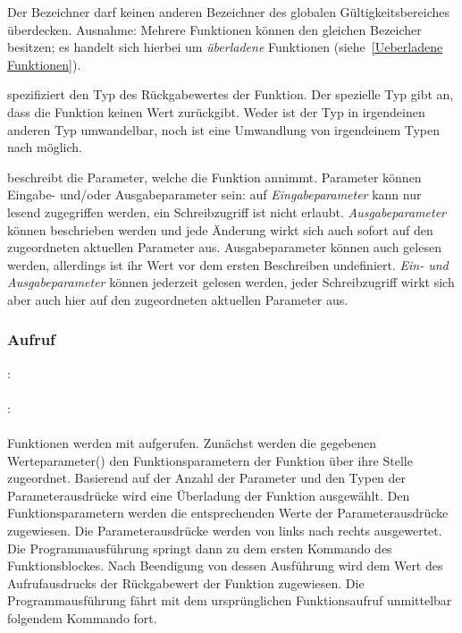 Der Bezeichner darf keinen anderen Bezeichner des globalen Gültigkeitsbereiches überdecken.
Ausnahme: Mehrere Funktionen können den gleichen Bezeicher besitzen; es handelt sich hierbei
um \emph{überladene} Funktionen (siehe~\ref{Ueberladene Funktionen}).

 spezifiziert den Typ des Rückgabewertes der Funktion. Der spezielle Typ 
gibt an, dass die Funktion keinen Wert zurückgibt.
Weder ist der Typ  in irgendeinen anderen Typ umwandelbar, noch ist eine Umwandlung
von irgendeinem Typen nach  möglich.

 beschreibt die Parameter, welche die Funktion annimmt.
Parameter können Eingabe- und/oder Ausgabeparameter sein: auf \emph{Eingabeparameter} kann
nur lesend zugegriffen werden, ein Schreibzugriff ist nicht erlaubt.
\emph{Ausgabeparameter} können beschrieben werden und jede Änderung wirkt sich auch sofort auf
den zugeordneten aktuellen Parameter aus. Ausgabeparameter können auch gelesen werden,
allerdings ist ihr Wert vor dem ersten Beschreiben undefiniert.
\emph{Ein- und Ausgabeparameter} können jederzeit gelesen werden, jeder Schreibzugriff wirkt sich
aber auch hier auf den zugeordneten aktuellen Parameter aus.



\subsubsection{Aufruf}\label{Aufruf}
:\label{funktion_aufruf}\\
\hspace*{1cm} \Gspace\Gt{(}\Gspace{}\Gspace\Gt{)}\\
:\label{funktion_param_aktuell}\\
\hspace*{1cm} \Gspace{}\\

Funktionen werden mit  aufgerufen. Zunächst werden die
gegebenen Werteparameter() den Funktionsparametern der Funktion über ihre Stelle zugeordnet.
Basierend auf der Anzahl der Parameter und den Typen der Parameterausdrücke wird eine Überladung der Funktion ausgewählt.
Den Funktionsparametern werden die entsprechenden Werte der Parameterausdrücke zugewiesen.
Die Parameterausdrücke werden von links nach rechts ausgewertet.
Die Programmausführung springt dann zu dem ersten
Kommando des Funktionsblockes. Nach Beendigung von dessen Ausführung wird dem Wert des Aufrufausdrucks der
Rückgabewert der Funktion zugewiesen. Die Programmausführung fährt mit dem ursprünglichen Funktionsaufruf
unmittelbar folgendem Kommando fort.

